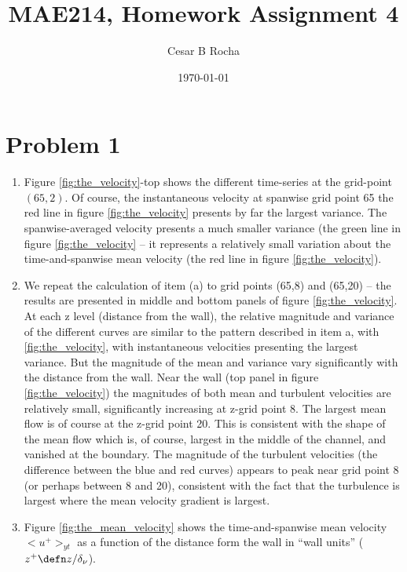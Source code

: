 \documentclass[11pt]{article}
\title{MAE214, Homework Assignment 4}
\author{Cesar B Rocha}
\date{\today}
\begin{document}


\maketitle

\section*{Problem 1}


\begin{enumerate}[label=(\alph*)]

    \item Figure \ref{fig:the_velocity}-top shows the different time-series at the grid-point $(65,2)$. 
        Of course, the instantaneous velocity at spanwise grid point 65 the red line in figure \ref{fig:the_velocity} presents by far the largest variance.
        The spanwise-averaged velocity presents a much smaller variance (the green line in figure \ref{fig:the_velocity} – it represents a relatively
        small variation about the time-and-spanwise mean velocity (the red line in figure \ref{fig:the_velocity}).

    \item We repeat the calculation of item (a) to grid points (65,8) and (65,20) – the results are presented in 
        middle and bottom panels of figure \ref{fig:the_velocity}. At each z level (distance from the wall), the
        relative magnitude and variance of the different curves are similar to the pattern described in item a, with
          \ref{fig:the_velocity}, with instantaneous velocities presenting the largest variance. But the magnitude of 
          the mean and variance vary significantly with the distance from the wall. Near the wall (top panel in figure \ref{fig:the_velocity}) the magnitudes of both mean and turbulent velocities are relatively small, significantly increasing at z-grid point 8. The largest mean flow is of course at the z-grid point 20. This is consistent with the shape of the
          mean flow which is, of course, largest in the middle of the channel, and vanished at the boundary. The magnitude of the turbulent velocities (the difference between the blue and red curves) appears to peak near grid point 8 (or perhaps between 8 and 20), consistent with the fact that the turbulence is largest where the mean velocity gradient is largest.

      \item Figure \ref{fig:the_mean_velocity} shows the time-and-spanwise mean velocity $<u^+>_{yt}$ as  a function
          of the distance form the wall in ``wall units'' ($z^+ \defn z/\delta_\nu$).



\end{enumerate}
\end{document}
